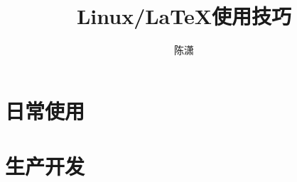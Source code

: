 \documentclass[lang=cn,10pt]{AbsBook}
\title{Linux/\LaTeX{}使用技巧}
\author{陈潇}
\begin{document}
\maketitle
\makeflypage
\frontmatter

\tableofcontents

\mainmatter

\part{日常使用}



\part{生产开发}





\makebackcover
\end{document}
